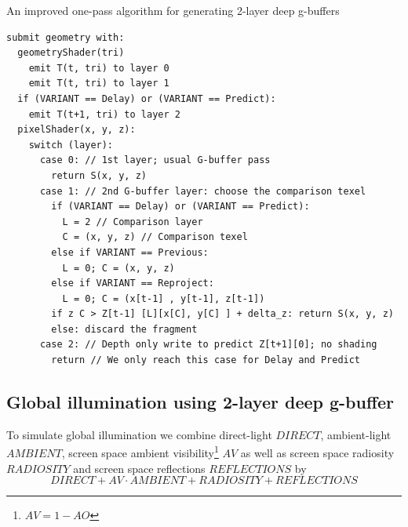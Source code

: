 \documentclass{ACGSeminar}
\begin{document}
		\begin{algorithm} \label{alg:one_pass_strawman} \caption{An improved one-pass algorithm for generating 2-layer deep g-buffers}
		\begin{lstlisting}[frame=single]
submit geometry with:
  geometryShader(tri)
    emit T(t, tri) to layer 0
    emit T(t, tri) to layer 1
  if (VARIANT == Delay) or (VARIANT == Predict):
    emit T(t+1, tri) to layer 2
  pixelShader(x, y, z):
    switch (layer):
      case 0: // 1st layer; usual G-buffer pass
        return S(x, y, z)
      case 1: // 2nd G-buffer layer: choose the comparison texel
        if (VARIANT == Delay) or (VARIANT == Predict):
          L = 2 // Comparison layer
          C = (x, y, z) // Comparison texel
        else if VARIANT == Previous:
          L = 0; C = (x, y, z)
        else if VARIANT == Reproject:
          L = 0; C = (x[t-1] , y[t-1], z[t-1])
        if z C > Z[t-1] [L][x[C], y[C] ] + delta_z: return S(x, y, z)
        else: discard the fragment
      case 2: // Depth only write to predict Z[t+1][0]; no shading
        return // We only reach this case for Delay and Predict
		\end{lstlisting}
		\end{algorithm}
	\subsection{Global illumination using 2-layer deep g-buffer} 
		To simulate global illumination we combine direct-light $DIRECT$, ambient-light $AMBIENT$, screen space ambient visibility\footnote{$AV = 1-AO$} $AV$ as well as screen space radiosity $RADIOSITY$ and screen space reflections $REFLECTIONS$ by \cite{RSM} \cite{TSTMT}
		$$ DIRECT + AV \cdot AMBIENT + RADIOSITY + REFLECTIONS $$
		
\end{document}
